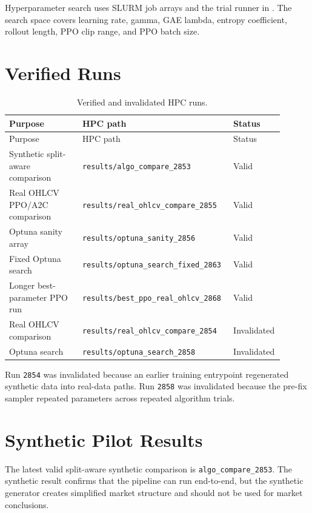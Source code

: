\documentclass[11pt]{article}
\begin{document}
Hyperparameter search uses SLURM job arrays and the trial runner in . The search space covers learning rate, gamma, GAE lambda, entropy coefficient, rollout length, PPO clip range, and PPO batch size.

\section{Verified Runs}
\begin{longtable}{p{0.26\linewidth}p{0.52\linewidth}p{0.12\linewidth}}
\caption{Verified and invalidated HPC runs.}
\label{tab:runs}\\
\toprule
Purpose & HPC path & Status \\
\midrule
\endfirsthead
\toprule
Purpose & HPC path & Status \\
\midrule
\endhead
Synthetic split-aware comparison & \texttt{results/algo\_compare\_2853} & Valid \\
Real OHLCV PPO/A2C comparison & \texttt{results/real\_ohlcv\_compare\_2855} & Valid \\
Optuna sanity array & \texttt{results/optuna\_sanity\_2856} & Valid \\
Fixed Optuna search & \texttt{results/optuna\_search\_fixed\_2863} & Valid \\
Longer best-parameter PPO run & \texttt{results/best\_ppo\_real\_ohlcv\_2868} & Valid \\
Real OHLCV comparison & \texttt{results/real\_ohlcv\_compare\_2854} & Invalidated \\
Optuna search & \texttt{results/optuna\_search\_2858} & Invalidated \\
\bottomrule
\end{longtable}

Run \texttt{2854} was invalidated because an earlier training entrypoint regenerated synthetic data into real-data paths. Run \texttt{2858} was invalidated because the pre-fix sampler repeated parameters across repeated algorithm trials.

\section{Synthetic Pilot Results}
The latest valid split-aware synthetic comparison is \texttt{algo\_compare\_2853}. The synthetic result confirms that the pipeline can run end-to-end, but the synthetic generator creates simplified market structure and should not be used for market conclusions.
\end{document}
